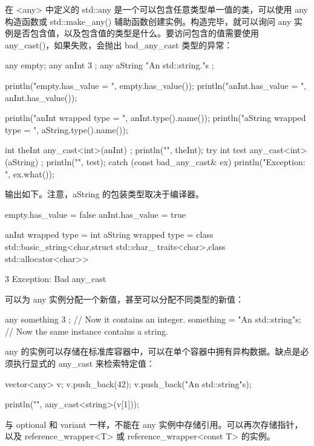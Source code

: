 在 <any> 中定义的 std::any 是一个可以包含任意类型单一值的类，可以使用 any 构造函数或 std::make\_any() 辅助函数创建实例。构造完毕，就可以询问 any 实例是否包含值，以及包含值的类型是什么。要访问包含的值需要使用 any\_cast()，如果失败，会抛出 bad\_any\_cast 类型的异常：

\begin{cpp}
any empty;
any anInt { 3 };
any aString { "An std::string."s };

println("empty.has_value = {}", empty.has_value());
println("anInt.has_value = {}\n", anInt.has_value());

println("anInt wrapped type = {}", anInt.type().name());
println("aString wrapped type = {}\n", aString.type().name());

int theInt { any_cast<int>(anInt) };
println("{}", theInt);
try {
    int test { any_cast<int>(aString) };
    println("{}", test);
} catch (const bad_any_cast& ex) {
    println("Exception: {}", ex.what());
}
\end{cpp}

输出如下。注意，aString 的包装类型取决于编译器。

\begin{shell}
empty.has_value = false
anInt.has_value = true

anInt wrapped type = int
aString wrapped type = class std::basic_string<char,struct std::char_
traits<char>,class std::allocator<char>>

3
Exception: Bad any_cast
\end{shell}

可以为 any 实例分配一个新值，甚至可以分配不同类型的新值：

\begin{cpp}
any something { 3 }; // Now it contains an integer.
something = "An std::string"s; // Now the same instance contains a string.
\end{cpp}

any 的实例可以存储在标准库容器中，可以在单个容器中拥有异构数据。缺点是必须执行显式的 any\_cast 来检索特定值：

\begin{cpp}
vector<any> v;
v.push_back(42);
v.push_back("An std::string"s);

println("{}", any_cast<string>(v[1]));
\end{cpp}

与 optional 和 variant 一样，不能在 any 实例中存储引用。可以再次存储指针，以及 reference\_wrapper<T> 或 reference\_wrapper<const T> 的实例。




